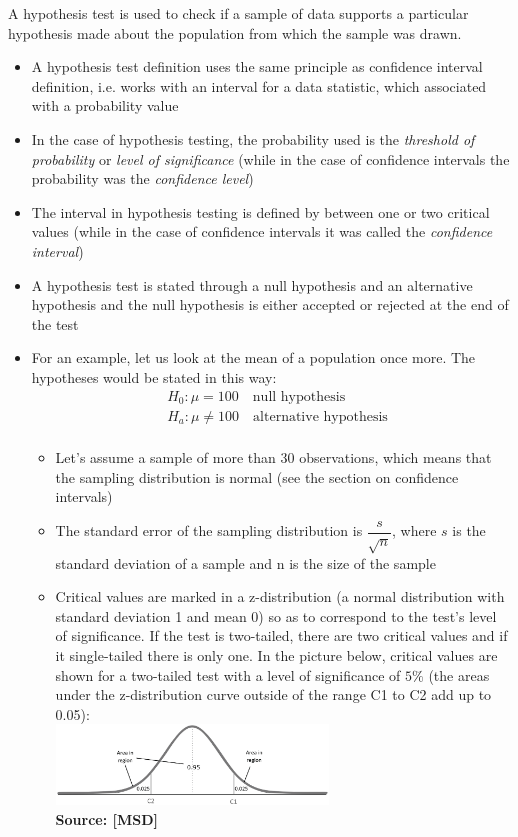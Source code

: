 A hypothesis test is used to check if a sample of data supports a particular hypothesis made about the population from which the sample was drawn.
\begin{itemize}
\item A hypothesis test definition uses the same principle as confidence interval definition, i.e. works with an interval for a data statistic, which associated with a probability value
\item In the case of hypothesis testing, the probability used is the \emph{threshold of probability} or \emph{level of significance} (while in the case of confidence intervals the probability was the \emph{confidence level})
\item The interval in hypothesis testing is defined by between one or two critical values (while in the case of confidence intervals it was called the \emph{confidence interval})
\item A hypothesis test is stated through a null hypothesis and an alternative hypothesis and the null hypothesis is either accepted or rejected at the end of the test
\item For an example, let us look at the mean of a population once more. The hypotheses would be stated in this way:
{\setlength{\mathindent}{0cm}
\begin{align*}
  &H_0: \mu = 100    \quad \text{null hypothesis} \\
  &H_a: \mu \neq 100 \quad \text{alternative hypothesis} \\
\end{align*}}
  \begin{itemize}
  \item Let's assume a sample of more than 30 observations, which means that the sampling distribution is normal (see the section on confidence intervals)
  \item The standard error of the sampling distribution is $\dfrac{s}{\sqrt{n}}$, where $s$ is the standard deviation of a sample and n is the size of the sample
  \item Critical values are marked in a z-distribution (a normal distribution with standard deviation 1 and mean 0) so as to correspond to the test's level of significance. If the test is two-tailed, there are two critical values and if it single-tailed there is only one. In the picture below, critical values are shown for a two-tailed test with a level of significance of $5\%$ (the areas under the z-distribution curve outside of the range C1 to C2 add up to 0.05): \\ [1ex]
    \includegraphics[width=0.6\textwidth]{hypothesis_test.png} \\ [-1.5ex]
    {\fontsize{10}{0}\selectfont \textbf{Source: [MSD]}}
    

\end{itemize}
\end{itemize}
